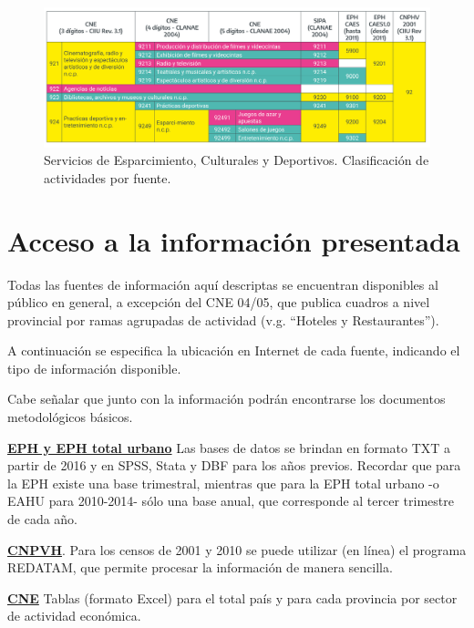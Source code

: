 \documentclass[
  openany]{book}
\begin{document}
\begin{figure}

{\centering \includegraphics[width=1\linewidth]{imagenes/figura3.11} 

}

\caption{ Servicios de Esparcimiento, Culturales y  Deportivos. Clasificación de actividades por fuente.}\label{fig:empleofuentes11}
\end{figure}

\hypertarget{acceso-a-la-informaciuxf3n-presentada}{%
\section{Acceso a la información presentada}\label{acceso-a-la-informaciuxf3n-presentada}}

Todas las fuentes de información aquí descriptas se encuentran disponibles al público en general, a excepción del CNE 04/05, que publica cuadros a nivel provincial por ramas agrupadas de actividad (v.g. ``Hoteles y Restaurantes'').

A continuación se especifica la ubicación en Internet de cada fuente, indicando el tipo de información disponible.

Cabe señalar que junto con la información podrán encontrarse los documentos metodológicos básicos.

\href{https://www.indec.gob.ar/indec/web/Institucional-Indec-BasesDeDatos-1}{\textbf{EPH y EPH total urbano}} Las bases de datos se brindan en formato TXT a partir de 2016 y en SPSS, Stata y DBF para los años previos.
Recordar que para la EPH existe una base trimestral, mientras que para la EPH total urbano -o EAHU para 2010-2014- sólo una base anual, que corresponde al tercer trimestre de cada año.

\href{https://www.indec.gob.ar/indec/web/Nivel3-Tema-2-41}{\textbf{CNPVH}}. Para los censos de 2001 y 2010 se puede utilizar (en línea) el programa REDATAM, que permite procesar la información de manera sencilla.

\href{https://sitioanterior.indec.gob.ar/cne2005_index.asp}{\textbf{CNE}} Tablas (formato Excel) para el total país y para cada provincia por sector de actividad económica.
\end{document}
